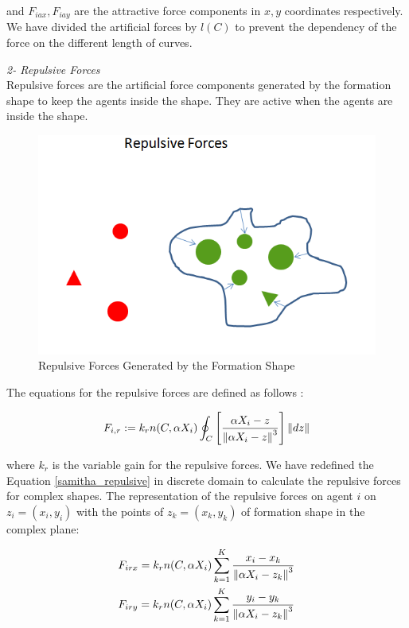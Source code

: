 and $F_{iax} , F_{iay} $ are the attractive force components in $x,y$ coordinates respectively. We have divided the artificial forces by $l(C)$ to prevent the dependency of the force on the different length of curves.
			
\textit{	2- Repulsive Forces} \\ 
Repulsive forces are the artificial force components generated by the formation shape to keep the agents inside the shape. They are active when the agents are inside the shape. 
					
\begin{figure}[H]
\caption{Repulsive Forces Generated by the Formation Shape}
\centering
\includegraphics[scale = 0.60]{repulsive_forces}
\end{figure}
							
The equations for the repulsive forces are defined as follows \cite{17}:	

\begin{equation} \label{samitha_repulsive}
F_{i,r} := k_r  n(C,\alpha X_i) \oint_C \left[\frac{\alpha X_i - z}{\left\lVert\alpha X_i - z\right\rVert^3}\right] \left\lVert dz\right\rVert
\end{equation}

where $k_r$ is the variable gain for the repulsive forces. We have redefined the Equation \ref{samitha_repulsive} in discrete domain to calculate the repulsive forces for complex shapes. The representation of the repulsive forces on agent $i$ on $z_i = (x_i, y_i)$ with the points of  $z_k = (x_k,y_k)$ of formation shape in the complex plane:

\begin{align}
\begin{split}
& F_{irx} = k_r n(C,\alpha X_i)  \sum_{k=1}^{K} \frac{x_i - x_k}{\left\lVert\alpha X_i - z_k\right\rVert^3}\\
& F_{iry} = k_r n(C,\alpha X_i)  \sum_{k=1}^{K} \frac{y_i - y_k}{\left\lVert\alpha X_i - z_k\right\rVert^3}
\end{split}
\end{align}
				
